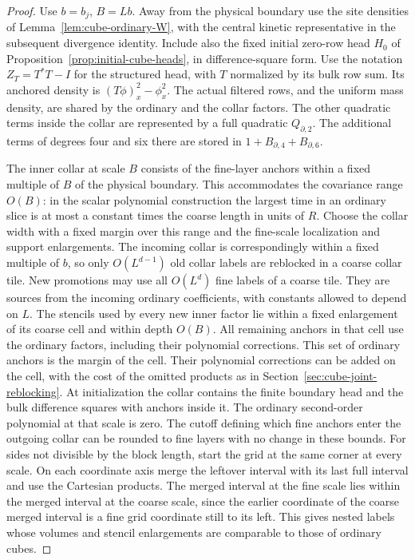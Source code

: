 \documentclass[11pt]{article}
\theoremstyle{definition}
\begin{document}
\begin{proof}
Use \(b=b_j\), \(B=Lb\). Away from the physical boundary use the site
densities of Lemma~\ref{lem:cube-ordinary-W}, with the central kinetic
representative in the subsequent divergence identity. Include also
the fixed initial zero-row head \(H_0\) of
Proposition~\ref{prop:initial-cube-heads}, in difference-square form.
Use the notation \(Z_T=T^*T-I\) for the structured head, with \(T\)
normalized by its bulk row sum. Its anchored density is
\((T\phi)_x^2-\phi_x^2\). The actual filtered rows, and the uniform
mass density, are shared by the ordinary and the collar factors.
The other quadratic terms inside the collar are represented by a full
quadratic \(Q_{\partial,2}\). The additional terms of degrees four
and six there are stored in \(1+B_{\partial,4}+B_{\partial,6}\).

The inner collar at scale \(B\) consists of the fine-layer
anchors within a fixed multiple of \(B\) of the physical boundary.
This accommodates the covariance range \(O(B)\): in the scalar
polynomial construction the largest time in an ordinary slice
is at most a constant times the coarse length in units of \(R\).
Choose the collar width with a fixed margin over this range and
the fine-scale localization and support enlargements. The
incoming collar is correspondingly within a fixed multiple of
\(b\), so only \(O(L^{d-1})\) old collar labels are reblocked
in a coarse collar tile. New promotions may use all \(O(L^d)\)
fine labels of a coarse tile. They are sources from the incoming
ordinary coefficients, with constants allowed to depend on \(L\).
The stencils used by every new inner factor lie within a fixed
enlargement of its coarse cell and within depth \(O(B)\).
All remaining anchors in that cell use the ordinary factors,
including their polynomial corrections. This set of ordinary
anchors is the margin of the cell. Their polynomial corrections
can be added on the cell, with the cost of the omitted products
as in Section~\ref{sec:cube-joint-reblocking}. At initialization
the collar contains the finite boundary head and the bulk difference
squares with anchors inside it. The ordinary second-order
polynomial at that scale is zero. The cutoff defining which fine
anchors enter the outgoing collar can be rounded to fine layers
with no change in these bounds. For sides not divisible by the
block length, start the grid at the same corner at every scale.
On each coordinate axis merge the leftover interval with its last
full interval and use the Cartesian products. The merged interval
at the fine scale lies within the merged interval at the coarse
scale, since the earlier coordinate of the coarse merged interval
is a fine grid coordinate still to its left. This gives nested
labels whose volumes and stencil enlargements are comparable to
those of ordinary cubes.


\end{proof}
\end{document}
